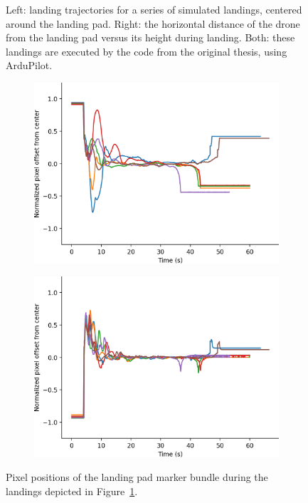 \begin{figure}
\begin{subfigure}[b]{0.49\textwidth}
    \end{subfigure}
    \caption{Left: landing trajectories for a series of simulated landings, centered around the landing pad. Right: the horizontal distance of the drone from the landing pad versus its height during landing. Both: these landings are executed by the code from the original thesis, using ArduPilot.}
    \label{figure:apriltag48h12_landings}
\end{figure}

\begin{figure}
    \center
    \begin{subfigure}[b]{0.49\textwidth}
         \centering
         \includegraphics[width=\textwidth]{images/visual_center_x}
    \end{subfigure}
    \hfill
    \begin{subfigure}[b]{0.49\textwidth}
         \centering
         \includegraphics[width=\textwidth]{images/visual_center_y}
    \end{subfigure}
    \caption{Pixel positions of the landing pad marker bundle during the landings depicted in Figure~\ref{figure:apriltag48h12_landings}.}
    \label{figure:apriltag48h12_landings_tracking}
\end{figure}

